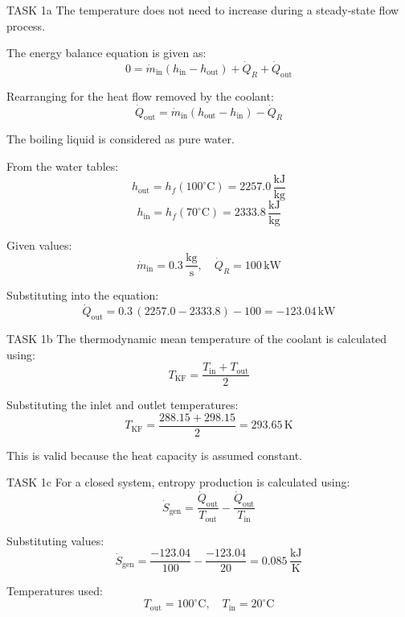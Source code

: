 TASK 1a  
The temperature does not need to increase during a steady-state flow process.  

The energy balance equation is given as:  
\[
0 = \dot{m}_{\text{in}} (h_{\text{in}} - h_{\text{out}}) + \dot{Q}_R + \dot{Q}_{\text{out}}
\]  

Rearranging for the heat flow removed by the coolant:  
\[
\dot{Q}_{\text{out}} = \dot{m}_{\text{in}} (h_{\text{out}} - h_{\text{in}}) - \dot{Q}_R
\]  

The boiling liquid is considered as pure water.  

From the water tables:  
\[
h_{\text{out}} = h_f(100^\circ\text{C}) = 2257.0 \, \frac{\text{kJ}}{\text{kg}}
\]  
\[
h_{\text{in}} = h_f(70^\circ\text{C}) = 2333.8 \, \frac{\text{kJ}}{\text{kg}}
\]  

Given values:  
\[
\dot{m}_{\text{in}} = 0.3 \, \frac{\text{kg}}{\text{s}}, \quad \dot{Q}_R = 100 \, \text{kW}
\]  

Substituting into the equation:  
\[
\dot{Q}_{\text{out}} = 0.3 \, (2257.0 - 2333.8) - 100 = -123.04 \, \text{kW}
\]  

TASK 1b  
The thermodynamic mean temperature of the coolant is calculated using:  
\[
T_{\text{KF}} = \frac{T_{\text{in}} + T_{\text{out}}}{2}
\]  

Substituting the inlet and outlet temperatures:  
\[
T_{\text{KF}} = \frac{288.15 + 298.15}{2} = 293.65 \, \text{K}
\]  

This is valid because the heat capacity is assumed constant.  

TASK 1c  
For a closed system, entropy production is calculated using:  
\[
\dot{S}_{\text{gen}} = \frac{\dot{Q}_{\text{out}}}{T_{\text{out}}} - \frac{\dot{Q}_{\text{out}}}{T_{\text{in}}}
\]  

Substituting values:  
\[
\dot{S}_{\text{gen}} = \frac{-123.04}{100} - \frac{-123.04}{20} = 0.085 \, \frac{\text{kJ}}{\text{K}}
\]  

Temperatures used:  
\[
T_{\text{out}} = 100^\circ\text{C}, \quad T_{\text{in}} = 20^\circ\text{C}
\]